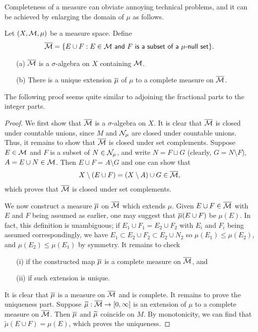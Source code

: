 Completeness of a measure can obviate annoying technical problems, and it can be achieved by enlarging the domain of $\mu$ as follows.
\begin{thm}\label{completion of a measure}
    Let $(X, {\mathcal{M}}, \mu)$ be a measure space.
    Define
    \begin{align*}
        \overline{{\mathcal{M}}}=\{E\cup F:\textsf{$E\in{\mathcal{M}}$ and $F$ is a subset of a $\mu$-null set}\}.
    \end{align*}
    \begin{enumerate}
        \item[(a)]
        {
            $\overline{{\mathcal{M}}}$ is a $\sigma$-algebra on $X$ containing ${\mathcal{M}}$.
        }
        \item[(b)]
        {
            There is a unique extension $\overline{\mu}$ of $\mu$ to a complete measure on $\overline{{\mathcal{M}}}$.
        }
    \end{enumerate}
\end{thm}
\begin{rmk}
    The following proof seems quite similar to adjoining the fractional parts to the integer parts.
\end{rmk}
\begin{proof}
    We first show that $\overline{{\mathcal{M}}}$ is a $\sigma$-algebra on $X$.
    It is clear that $\overline{{\mathcal{M}}}$ is closed under countable unions, since $M$ and ${\mathcal{N}}_\mu$ are closed under countable unions.
    Thus, it remains to show that $\overline{{\mathcal{M}}}$ is closed under set complements.
    Suppose $E\in{\mathcal{M}}$ and $F$ is a subset of $N\in{\mathcal{N}}_\mu$, and write $N=F\sqcup G$ (clearly, $G=N\setminus F$), $A=E\cup N\in{\mathcal{M}}$.
    Then $E\cup F=A\setminus G$ and one can show that
    \begin{align*}
        X\setminus (E\cup F)=(X\setminus A)\cup G\in\overline{{\mathcal{M}}},
    \end{align*}
    which proves that $\overline{{\mathcal{M}}}$ is closed under set complements.
    
    We now construct a measure $\overline{\mu}$ on $\overline{{\mathcal{M}}}$ which extends $\mu$.
    Given $E\cup F\in\overline{{\mathcal{M}}}$ with $E$ and $F$ being assumed as earlier, one may suggest that $\overline{\mu}(E\cup F)$ be $\mu(E)$.
    In fact, this definition is unambiguous; if $E_1\cup F_1=E_2\cup F_2$ with $E_i$ and $F_i$ being assumed correspondingly, we have $E_1\subset E_2\cup F_2\subset E_2\cup N_2$ so $\mu(E_1)\leq\mu(E_2)$, and $\mu(E_2)\leq\mu(E_1)$ by symmetry.
    It remains to check
    \begin{enumerate}
        \item[(i)]
        {
            if the constructed map $\overline{\mu}$ is a complete measure on $\overline{{\mathcal{M}}}$, and
        }
        \item[(ii)]
        {
            if such extension is unique.
        }
    \end{enumerate}
    It is clear that $\overline{\mu}$ is a measure on $\overline{{\mathcal{M}}}$ and is complete.
    It remains to prove the uniqueness part.
    Suppose $\widetilde{\mu}: \overline{{\mathcal{M}}}\rightarrow[0, \infty]$ is an extension of $\mu$ to a complete measure on $\overline{{\mathcal{M}}}$.
    Then $\overline{\mu}$ and $\widetilde{\mu}$ coincide on $M$.
    By monotonicity, we can find that $\widetilde{\mu}(E\cup F)=\mu(E)$, which proves the uniqueness.
\end{proof}
